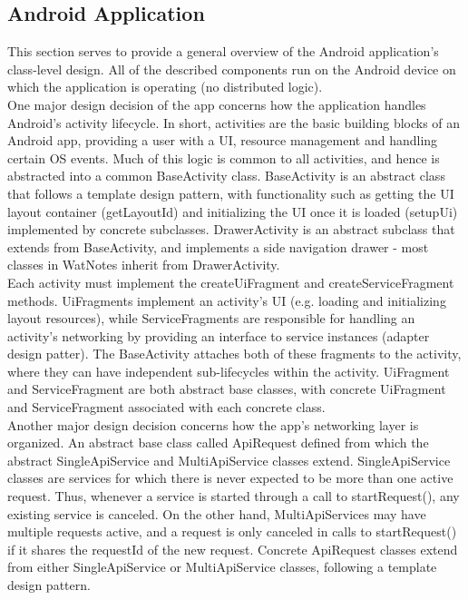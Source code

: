 \documentclass[12pt]{article}
\begin{document}
  \subsection{Android Application}
    This section serves to provide a general overview of the Android application's class-level design. All of the described components run on the Android
    device on which the application is operating (no distributed logic). \\

    One major design decision of the app concerns how the application handles Android's activity lifecycle. In short, activities are the basic building blocks of
    an Android app, providing a user with a UI, resource management and handling certain OS events. Much of this logic is common to all activities, and
    hence is abstracted into a common BaseActivity class. BaseActivity is an abstract class that follows a template design pattern, with functionality
    such as getting the UI layout container (getLayoutId) and initializing the UI once it is loaded (setupUi) implemented by concrete subclasses. DrawerActivity
    is an abstract subclass that extends from BaseActivity, and implements a side navigation drawer - most classes in WatNotes inherit from DrawerActivity. \\

    Each activity must implement the createUiFragment and createServiceFragment methods. UiFragments implement an activity's UI (e.g. loading and
    initializing layout resources), while ServiceFragments are responsible for handling an activity's networking by providing an interface
    to service instances (adapter design patter). The BaseActivity attaches both of these fragments to the activity, where they can have independent sub-lifecycles
    within the activity. UiFragment and ServiceFragment are both abstract base classes, with concrete UiFragment and ServiceFragment associated with each
    concrete class. \\

    Another major design decision concerns how the app's networking layer is organized. An abstract base class called ApiRequest defined from which the abstract
    SingleApiService and MultiApiService classes extend. SingleApiService classes are services for which there is never expected to be more than one active request. Thus, whenever
    a service is started through a call to startRequest(), any existing service is canceled. On the other hand, MultiApiServices may have multiple requests active,
    and a request is only canceled in calls to startRequest() if it shares the requestId of the new request. Concrete ApiRequest classes extend from either
    SingleApiService or MultiApiService classes, following a template design pattern. \\
\end{document}
